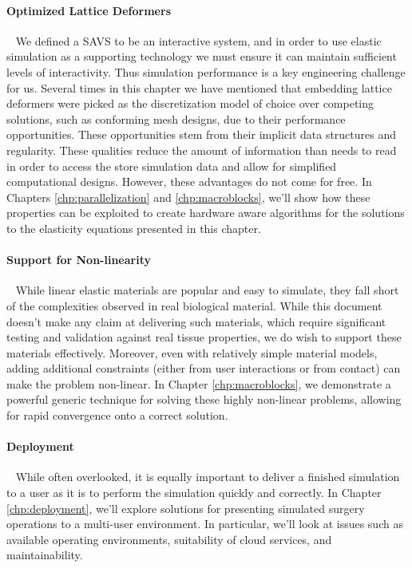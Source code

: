     \paragraph{Optimized Lattice Deformers}~ We defined a
      SAVS to be an interactive system, and in order to use
      elastic simulation as a supporting technology we must ensure it
      can maintain sufficient levels of interactivity. Thus simulation
      performance is a key engineering challenge for us. Several times in this
      chapter we have mentioned that embedding lattice deformers were
      picked as the discretization model of choice over competing
      solutions, such as conforming mesh designs, due to their
      performance opportunities. These opportunities stem from their
      implicit data structures and regularity. These qualities reduce
      the amount of information than needs to read in order to access
      the store simulation data and allow for simplified computational
      designs.  However, these advantages do not come for free. In
      Chapters \ref{chp:parallelization} and \ref{chp:macroblocks}, we'll show
      how these properties can be exploited to create hardware aware
      algorithms for the solutions to the elasticity equations
      presented in this chapter. 
      
    \paragraph{Support for Non-linearity}~ While linear elastic
      materials are popular and easy to simulate, they fall short of
      the complexities observed in real biological material. While
      this document doesn't make any claim at delivering such
      materials, which require significant testing and validation
      against real tissue properties, we do wish to support these
      materials effectively. Moreover, even with relatively simple
      material models, adding additional constraints (either from
      user interactions or from contact) can make the problem
      non-linear. In Chapter \ref{chp:macroblocks}, we demonstrate a
      powerful generic technique for solving these highly non-linear
      problems, allowing for rapid convergence onto a correct
      solution.
      
    \paragraph{Deployment}~ While often overlooked, it is equally
      important to deliver a finished simulation to a user as it is to
      perform the simulation quickly and correctly. In Chapter
      \ref{chp:deployment}, we'll explore solutions for presenting
      simulated surgery operations to a multi-user environment. In
      particular, we'll look at issues such as available operating
      environments, suitability of cloud services, and maintainability.
   
  
  
